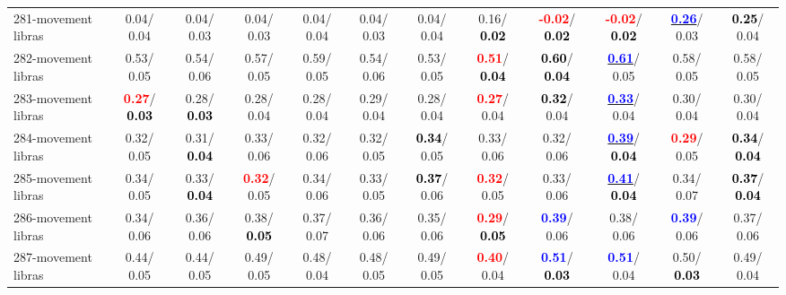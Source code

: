 \begin{table}[h]
\begin{center}
{\begin{tabular}{lc|c|c|c|c|c|c|c|c|c|c}
281-movement libras &   0.04/  0.04 &   0.04/  0.03 &   0.04/  0.03 &   0.04/  0.04 &   0.04/  0.03 &   0.04/  0.04 &   0.16/\textcolor{black}{\textbf{  0.02}} & \textcolor{red}{\textbf{ -0.02}}/\textcolor{black}{\textbf{  0.02}} & \textcolor{red}{\textbf{ -0.02}}/\textcolor{black}{\textbf{  0.02}} & \underline{\textcolor{blue}{\textbf{  0.26}}}/  0.03 & \textcolor{black}{\textbf{  0.25}}/  0.04 \\
282-movement libras &   0.53/  0.05 &   0.54/  0.06 &   0.57/  0.05 &   0.59/  0.05 &   0.54/  0.06 &   0.53/  0.05 & \textcolor{red}{\textbf{  0.51}}/\textcolor{black}{\textbf{  0.04}} & \textcolor{black}{\textbf{  0.60}}/\textcolor{black}{\textbf{  0.04}} & \underline{\textcolor{blue}{\textbf{  0.61}}}/  0.05 &   0.58/  0.05 &   0.58/  0.05 \\
283-movement libras & \textcolor{red}{\textbf{  0.27}}/\textcolor{black}{\textbf{  0.03}} &   0.28/\textcolor{black}{\textbf{  0.03}} &   0.28/  0.04 &   0.28/  0.04 &   0.29/  0.04 &   0.28/  0.04 & \textcolor{red}{\textbf{  0.27}}/  0.04 & \textcolor{black}{\textbf{  0.32}}/  0.04 & \underline{\textcolor{blue}{\textbf{  0.33}}}/  0.04 &   0.30/  0.04 &   0.30/  0.04 \\
284-movement libras &   0.32/  0.05 &   0.31/\textcolor{black}{\textbf{  0.04}} &   0.33/  0.06 &   0.32/  0.06 &   0.32/  0.05 & \textcolor{black}{\textbf{  0.34}}/  0.05 &   0.33/  0.06 &   0.32/  0.06 & \underline{\textcolor{blue}{\textbf{  0.39}}}/\textcolor{black}{\textbf{  0.04}} & \textcolor{red}{\textbf{  0.29}}/  0.05 & \textcolor{black}{\textbf{  0.34}}/\textcolor{black}{\textbf{  0.04}} \\ \hline
285-movement libras &   0.34/  0.05 &   0.33/\textcolor{black}{\textbf{  0.04}} & \textcolor{red}{\textbf{  0.32}}/  0.05 &   0.34/  0.06 &   0.33/  0.05 & \textcolor{black}{\textbf{  0.37}}/  0.06 & \textcolor{red}{\textbf{  0.32}}/  0.05 &   0.33/  0.06 & \underline{\textcolor{blue}{\textbf{  0.41}}}/\textcolor{black}{\textbf{  0.04}} &   0.34/  0.07 & \textcolor{black}{\textbf{  0.37}}/\textcolor{black}{\textbf{  0.04}} \\
286-movement libras &   0.34/  0.06 &   0.36/  0.06 &   0.38/\textcolor{black}{\textbf{  0.05}} &   0.37/  0.07 &   0.36/  0.06 &   0.35/  0.06 & \textcolor{red}{\textbf{  0.29}}/\textcolor{black}{\textbf{  0.05}} & \textcolor{blue}{\textbf{  0.39}}/  0.06 &   0.38/  0.06 & \textcolor{blue}{\textbf{  0.39}}/  0.06 &   0.37/  0.06 \\
287-movement libras &   0.44/  0.05 &   0.44/  0.05 &   0.49/  0.05 &   0.48/  0.04 &   0.48/  0.05 &   0.49/  0.05 & \textcolor{red}{\textbf{  0.40}}/  0.04 & \textcolor{blue}{\textbf{  0.51}}/\textcolor{black}{\textbf{  0.03}} & \textcolor{blue}{\textbf{  0.51}}/  0.04 &   0.50/\textcolor{black}{\textbf{  0.03}} &   0.49/  0.04 \\

\end{tabular}}
\end{center}
\end{table}
